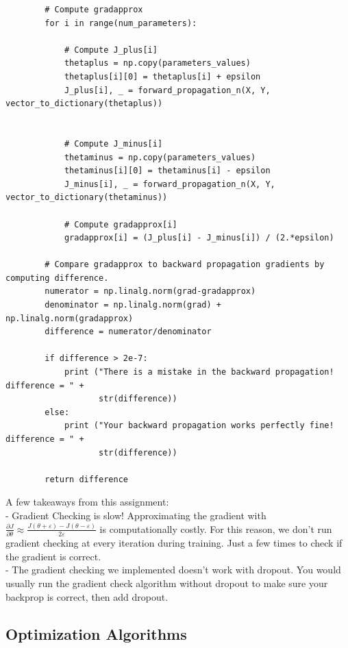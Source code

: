 \documentclass[11pt, a4paper]{article}
\begin{document}
\begin{spacing}{1.1}
\begin{lstlisting}
		# Compute gradapprox
		for i in range(num_parameters):
			
			# Compute J_plus[i]
			thetaplus = np.copy(parameters_values)                                    
			thetaplus[i][0] = thetaplus[i] + epsilon                               
			J_plus[i], _ = forward_propagation_n(X, Y, vector_to_dictionary(thetaplus))  

			
			# Compute J_minus[i]
			thetaminus = np.copy(parameters_values)                    
			thetaminus[i][0] = thetaminus[i] - epsilon         
			J_minus[i], _ = forward_propagation_n(X, Y, vector_to_dictionary(thetaminus)) 
			
			# Compute gradapprox[i]
			gradapprox[i] = (J_plus[i] - J_minus[i]) / (2.*epsilon)
		
		# Compare gradapprox to backward propagation gradients by computing difference.
		numerator = np.linalg.norm(grad-gradapprox)           
		denominator = np.linalg.norm(grad) + np.linalg.norm(gradapprox)      
		difference = numerator/denominator   
		
		if difference > 2e-7:
			print ("There is a mistake in the backward propagation! difference = " + 
			       str(difference))
		else:
			print ("Your backward propagation works perfectly fine! difference = " + 
			       str(difference))
		
		return difference\end{lstlisting} \vspace*{1mm}
	A few takeaways from this assignment: \\
	\hspace*{3mm} - Gradient Checking is slow! Approximating the gradient with $\frac{\partial J}{\partial \theta} \approx  \frac{J(\theta + \varepsilon) - J(\theta - \varepsilon)}{2 \varepsilon}$ is computationally \hspace*{6mm} costly. For this reason, we don't run gradient checking at every iteration during training. Just a \hspace*{6mm} few times to check if the gradient is correct. \\
	\hspace*{3mm} - The gradient checking we implemented doesn't work with dropout. You would usually run the \hspace*{6mm} gradient check algorithm without dropout to make sure your backprop is correct, then add dropout. \newpage

	\subsection{Optimization Algorithms}

\end{spacing}
\end{document}
